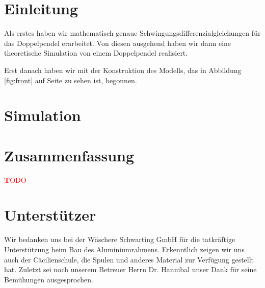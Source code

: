 \documentclass[a4paper, 10pt]{article}
\title{\mytitle}
\author{\myauthor}
\newcommand{\TODO}{\textcolor{red}{ \textbf TODO }}
\begin{document}
\maketitle
\begin{abstract}
In unserem Projekt beschäftigen wir uns mit dem Verhalten von chaotischen Doppelpendeln. Wir wollen aus der aktuellen Bewegung eines Doppelpendels den weiteren Bewegungsablauf in einem kurzen Zeitintervall extrapolieren und dann versuchen, diese Bewegung zu beeinflussen.

Hierzu wollen wir zunächst ein Doppelpendel konstruieren, bei dem Daten über den aktuellen Bewegungszustand erfasst werden können. Diese Daten sollen in Echtzeit von einem Computer ausgewertet werden, um laufend eine Prognose an die Messwerte anzupassen. Anhand dieser Prognose soll dann entschieden werden, ob das Pendel eine unerwünschte Bewegung durchführen wird, und wenn nötig, soll mithilfe mehrerer Spulen eine korrigierende magnetische Kraft erzeugt werden. Es könnte zum Beispiel erwünscht sein, einen Überschlag zu vermeiden.
\end{abstract}
\thispagestyle{empty}
\pagestyle{empty}

\clearpage
\tableofcontents

\clearpage
\setcounter{page}{1}
\pagestyle{fancy}

\section{Einleitung}
Als erstes haben wir mathematisch genaue Schwingungsdifferenzialgleichungen für das Doppelpendel erarbeitet.
Von diesen ausgehend haben wir dann eine theoretische Simulation von einem Doppelpendel realisiert.

Erst danach haben wir mit der Konstruktion des Modells, das in Abbildung \ref{fig:front} auf Seite \pageref{fig:front} zu sehen ist, begonnen.

\section{Simulation}




\section{Zusammenfassung}
\TODO

\clearpage
\section*{Unterstützer}

Wir bedanken uns bei der Wäschere Schwarting GmbH für die tatkräftige Unterstützung beim Bau des Aluminiumrahmens.
Erkenntlich zeigen wir uns auch der Cäcilienschule, die Spulen und anderes Material zur Verfügung gestellt hat.
Zuletzt sei noch unserem Betreuer Herrn Dr. Hannibal unser Dank für seine Bemühungen ausgesprochen.


{}
\end{document}
